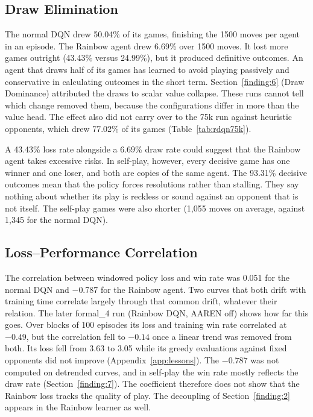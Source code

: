 \subsection{Draw Elimination}\label{finding:8}
The normal DQN drew 50.04\% of its games, finishing the 1500 moves per agent in an episode. The Rainbow agent drew 6.69\% over 1500 moves. It lost more games outright (43.43\% versus 24.99\%), but it produced definitive outcomes. An agent that draws half of its games has learned to avoid playing passively and conservative in calculating outcomes in the short term. Section~\ref{finding:6} (Draw Dominance) attributed the draws to scalar value collapse. These runs cannot tell which change removed them, because the configurations differ in more than the value head. The effect also did not carry over to the 75k run against heuristic opponents, which drew 77.02\% of its games (Table~\ref{tab:rdqn75k}).

A 43.43\% loss rate alongside a 6.69\% draw rate could suggest that the Rainbow agent takes excessive risks. In self-play, however, every decisive game has one winner and one loser, and both are copies of the same agent. The 93.31\% decisive outcomes mean that the policy forces resolutions rather than stalling. They say nothing about whether its play is reckless or sound against an opponent that is not itself. The self-play games were also shorter (1,055 moves on average, against 1,345 for the normal DQN).

\subsection{Loss--Performance Correlation}\label{finding:9}
The correlation between windowed policy loss and win rate was 0.051 for the normal DQN and $-$0.787 for the Rainbow agent. Two curves that both drift with training time correlate largely through that common drift, whatever their relation. The later formal\_4 run (Rainbow DQN, AAREN off) shows how far this goes. Over blocks of 100 episodes its loss and training win rate correlated at $-0.49$, but the correlation fell to $-0.14$ once a linear trend was removed from both. Its loss fell from 3.63 to 3.05 while its greedy evaluations against fixed opponents did not improve (Appendix~\ref{app:lessons}). The $-0.787$ was not computed on detrended curves, and in self-play the win rate mostly reflects the draw rate (Section~\ref{finding:7}). The coefficient therefore does not show that the Rainbow loss tracks the quality of play. The decoupling of Section~\ref{finding:2} appears in the Rainbow learner as well.

